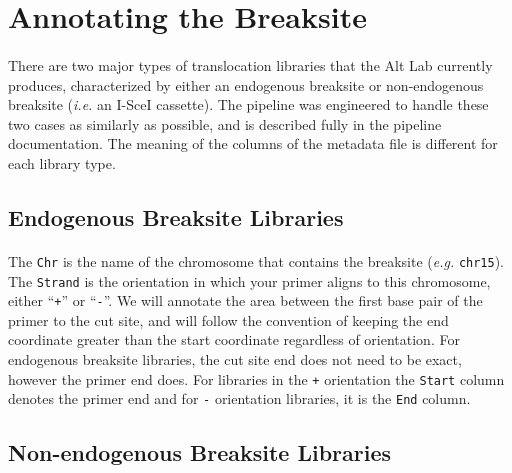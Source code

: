 \documentclass{article}
\begin{document}
\section{Annotating the Breaksite}
\paragraph{} There are two major types of translocation libraries that the Alt Lab currently produces, characterized by either an endogenous breaksite or non-endogenous breaksite (\emph{i.e.} an I-SceI cassette). The pipeline was engineered to handle these two cases as similarly as possible, and is described fully in the pipeline documentation. The meaning of the columns of the metadata file is different for each library type.

\subsection{Endogenous Breaksite Libraries}
\paragraph{} The \texttt{Chr} is the name of the chromosome that contains the breaksite (\emph{e.g.} \texttt{chr15}). The \texttt{Strand} is the orientation in which your primer aligns to this chromosome, either ``\texttt{+}'' or ``\texttt{-}''. We will annotate the area between the first base pair of the primer to the cut site, and will follow the convention of keeping the end coordinate greater than the start coordinate regardless of orientation. For endogenous breaksite libraries, the cut site end does not need to be exact, however the primer end does. For libraries in the \texttt{+} orientation the \texttt{Start} column denotes the primer end and for \texttt{-} orientation libraries, it is the \texttt{End} column.


\subsection{Non-endogenous Breaksite Libraries}
\paragraph{}
\end{document}
